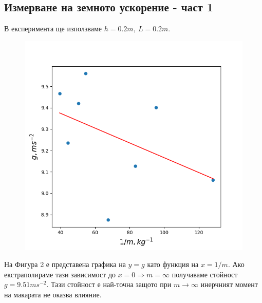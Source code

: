\documentclass[aps, prb, twocolumn, a4paper, floatfix, reprint]{revtex4-2}
\begin{document}
\subsection{Измерване на земното ускорение - част 1}
В експеримента ще използваме $h=0.2m, \  L=0.2m$. 
\begin{figure}[H]
    \centering
    \caption{}
    \includegraphics[width=\columnwidth, keepaspectratio=true]{Figure_2.png}
\end{figure}
На Фигура 2 е представена графика на $y=g$ като функция на $x=1/m$. Ако екстраполираме тази зависимост до $x=0 \Rightarrow m=\infty$ получаваме стойност $g=9.51 ms^{-2}$. Тази стойност е най-точна защото при $m \rightarrow \infty$ инерчният момент на макарата не оказва влияние. 
\end{document}
